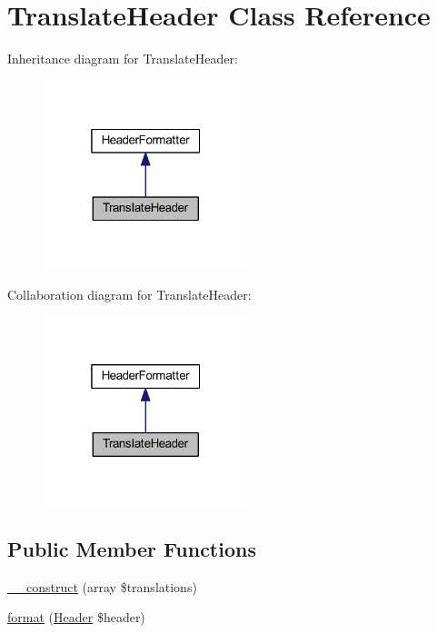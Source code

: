 \hypertarget{classhamburgscleanest_1_1_data_tables_1_1_models_1_1_header_formatters_1_1_translate_header}{}\section{Translate\+Header Class Reference}
\label{classhamburgscleanest_1_1_data_tables_1_1_models_1_1_header_formatters_1_1_translate_header}


Inheritance diagram for Translate\+Header\+:
\nopagebreak
\begin{figure}[H]
\begin{center}
\leavevmode
\includegraphics[width=169pt]{classhamburgscleanest_1_1_data_tables_1_1_models_1_1_header_formatters_1_1_translate_header__inherit__graph}
\end{center}
\end{figure}


Collaboration diagram for Translate\+Header\+:
\nopagebreak
\begin{figure}[H]
\begin{center}
\leavevmode
\includegraphics[width=169pt]{classhamburgscleanest_1_1_data_tables_1_1_models_1_1_header_formatters_1_1_translate_header__coll__graph}
\end{center}
\end{figure}
\subsection*{Public Member Functions}
\begin{DoxyCompactItemize}
\item 
\hyperlink{classhamburgscleanest_1_1_data_tables_1_1_models_1_1_header_formatters_1_1_translate_header_acc98a5aed09e4bdbeaa0bd231155a021}{\+\_\+\+\_\+construct} (array \$translations)
\item 
\hyperlink{classhamburgscleanest_1_1_data_tables_1_1_models_1_1_header_formatters_1_1_translate_header_aa5aeddf9c056d9583b29322f75f70f82}{format} (\hyperlink{classhamburgscleanest_1_1_data_tables_1_1_models_1_1_header}{Header} \$header)
\end{DoxyCompactItemize}


